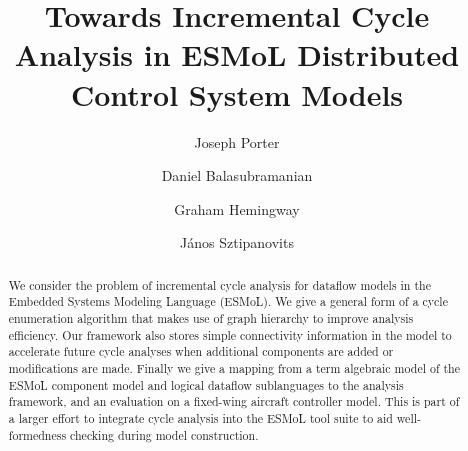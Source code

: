 \documentclass{llncs}
\begin{document}
%
%
\ifx\techreport\undefined
\pagestyle{headings}  %
%
%
\mainmatter              %
\fi
%
\title{Towards Incremental Cycle Analysis in ESMoL Distributed Control System
Models}
%
\ifx\techreport\undefined
{}  %
%
\author{Joseph Porter \and Daniel Balasubramanian \and Graham Hemingway \and J\'{a}nos Sztipanovits}
%
%
%
\fi

\ifx\techreport\undefined
\else

\fi

\ifx\techreport\undefined
\maketitle %
\fi


\begin{abstract}
We consider the problem of incremental cycle analysis for dataflow models in 
the Embedded Systems Modeling Language (ESMoL).  We give a general form of a
cycle enumeration algorithm that makes use of graph hierarchy to improve
analysis efficiency.  Our framework also stores simple connectivity information
in the model to accelerate future cycle analyses when additional components
are added or modifications are made.  Finally we give a mapping from a term
algebraic model of the ESMoL component model and logical dataflow sublanguages
to the analysis framework, and an evaluation on a fixed-wing aircraft controller model.  This is part of a larger effort to integrate cycle analysis into the ESMoL tool suite to aid well-formedness checking during model construction.
\ifx\techreport\undefined
{}
\fi
\end{abstract}
%
\end{document}
